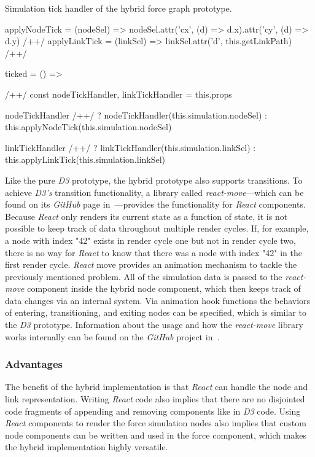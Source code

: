 \begin{program}
\caption{Simulation tick handler of the hybrid force graph prototype.}
\label{prog:hybridTickHandler}
\begin{JsCode}
applyNodeTick = (nodeSel) => nodeSel.attr('cx', (d) => d.x).attr('cy', (d) => d.y) /+\label{line:applyNodeTick}+/
applyLinkTick = (linkSel) => linkSel.attr('d', this.getLinkPath) /+\label{line:applyLinkTick}+/

ticked = () => { /+\label{line:hybridTickHhandler}+/
  const { nodeTickHandler, linkTickHandler } = this.props

  nodeTickHandler /+\label{line:decideNodeTickHandler}+/
    ? nodeTickHandler(this.simulation.nodeSel)
    : this.applyNodeTick(this.simulation.nodeSel)

  linkTickHandler /+\label{line:decideLinkTickHandler}+/
    ? linkTickHandler(this.simulation.linkSel)
    : this.applyLinkTick(this.simulation.linkSel)
}
\end{JsCode}
\end{program}

Like the pure \emph{D3} prototype, the hybrid prototype also supports transitions. To achieve \emph{D3's} transition functionality, a library called \emph{react-move}---which can be found on its \emph{GitHub} page in~\cite{ReactMove}---provides the functionality for \emph{React} components. Because \emph{React} only renders its current state as a function of state, it is not possible to keep track of data throughout multiple render cycles. If, for example, a node with index "42" exists in render cycle one but not in render cycle two, there is no way for \emph{React} to know that there was a node with index "42" in the first render cycle. \emph{React} move provides an animation mechanism to tackle the previously mentioned problem. All of the simulation data is passed to the \emph{react-move} component inside the hybrid node component, which then keeps track of data changes via an internal system. Via animation hook functions the behaviors of entering, transitioning, and exiting nodes can be specified, which is similar to the \emph{D3} prototype. Information about the usage and how the \emph{react-move} library works internally can be found on the \emph{GitHub} project in~\cite{ReactMove}.


\subsubsection{Advantages}

The benefit of the hybrid implementation is that \emph{React} can handle the node and link representation. Writing \emph{React} code also implies that there are no disjointed code fragments of appending and removing components like in \emph{D3} code. Using \emph{React} components to render the force simulation nodes also implies that custom node components can be written and used in the force component, which makes the hybrid implementation highly versatile.

